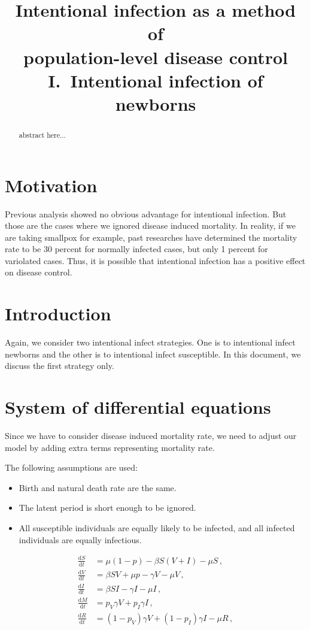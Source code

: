 \documentclass[12pt]{article}
\title{Intentional infection as a method of\\population-level disease
  control\\I.~Intentional infection of newborns}
\newcommand\dbyd[2]{\frac{\mathrm d{#1}}{\mathrm d{#2}}}
\newcommand{\pmV}{p_{V}}
\newcommand{\pmI}{p_{I}}
\begin{document}
\linenumbers
\maketitle

\begin{abstract}
abstract here...
\end{abstract}

\tableofcontents

\section{Motivation}

Previous analysis showed no obvious advantage for intentional infection. But those are the cases where we ignored disease induced mortality. In reality, if we are taking smallpox for example, past researches have determined the mortality rate to be 30 percent for normally infected cases, but only 1 percent for variolated cases. Thus, it is possible that intentional infection has a positive effect on disease control.

\section{Introduction}

Again, we consider two intentional infect strategies. One is to intentional infect newborns and the other is to intentional infect susceptible. In this document, we discuss the first strategy only.

\section{System of differential equations}
Since we have to consider disease induced mortality rate, we need to adjust our model by adding extra terms representing mortality rate.

The following assumptions are used:

\begin{itemize}
\item Birth and natural death rate are the same.
\item The latent period is short enough to be ignored.
\item All susceptible individuals are equally likely to be infected, and all infected individuals are equally infectious.
\end{itemize}

\begin{equation}\label{1}
\begin{split}
\dbyd{S}{t}&=\mu(1-p)- \beta S(V+I)-\mu S \,,\\
\dbyd{V}{t}&=\beta SV+\mu p-\gamma V -\mu V\,,\\
\dbyd{I}{t}&=\beta SI-\gamma I -\mu I\,,\\
\dbyd{M}{t}&=\pmV\gamma V+\pmI\gamma I\,,\\
\dbyd{R}{t}&=(1-\pmV)\gamma V+(1-\pmI)\gamma I-\mu R\,,
\end{split}
\end{equation}
\end{document}
